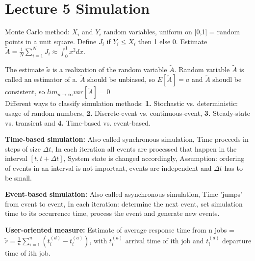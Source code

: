 \section{Lecture 5 Simulation}
Monte Carlo method: $X_{i}$ and $Y_{i}$ random variables, uniform on [0,1] = random points in a unit square. Define $J_{i}$ if $Y_{i} \leq X_{i}$ then 1 else 0. Estimate $\widetilde{A} = \frac{1}{N} \sum_{i=1}^{N} J_{i} \approx \int_{0}^{1} x^2 dx$.

The estimate $\widetilde{a}$ is a realization of the random variable $\widetilde{A}$. Random variable $\widetilde{A}$ is called an estimator of a. $\widetilde{A}$ should be unbiased, so $E[\widetilde{A}] = a$ and $\widetilde{A}$ shoudl be consistent, so $lim_{n\rightarrow\infty} var[\widetilde{A}] = 0$\\

Different ways to classify simulation methods: \textbf{1.} Stochastic vs. deterministic: usage of random numbers, \textbf{2.} Discrete-event vs. continuous-event, \textbf{3.} Steady-state vs. transient and \textbf{4.} Time-based vs. event-based.

\textbf{Time-based simulation:} Also called synchronous simulation, Time proceeds in steps of size $\Delta t$, In each iteration all events are processed that happen in the interval $[t,t + \Delta t]$, System state is changed accordingly, Assumption: ordering of events in an interval is not important, events are independent and $\Delta t$ has to be small.

\textbf{Event-based simulation:} Also called asynchronous simulation, Time 'jumps' from event to event, In each iteration: determine the next event, set simulation time to its occurrence time, process the event and generate new events.

\textbf{User-oriented measure:} Estimate of average response time from n jobs = $\widetilde{r} = \frac{1}{n} \sum_{i=1}^{n}(t_{i}^{(d)} - t_{i}^{(a)})$, with $t_{i}^{(a)}$ arrival time of ith job and $t_{i}^{(d)}$ departure time of ith job.

